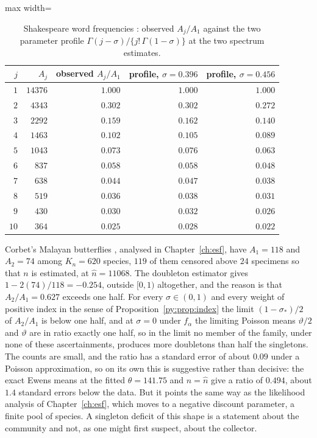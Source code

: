 \begin{table}[t]
\centering
\caption{Shakespeare word frequencies \citep{py:efron1976}: observed $A_j/A_1$ against the two
parameter profile $\Gamma(j-\sigma)/\{j!\,\Gamma(1-\sigma)\}$ at the two spectrum estimates.}
\label{py:tab:shakespeare}
\small
\begin{adjustbox}{max width=\textwidth}
\begin{tabular}{rrrrr}
\toprule
$j$ & $A_j$ & observed $A_j/A_1$ & profile, $\sigma = 0.396$ & profile, $\sigma = 0.456$\\
\midrule
$1$  & $14376$ & $1.000$ & $1.000$ & $1.000$\\
$2$  & $4343$  & $0.302$ & $0.302$ & $0.272$\\
$3$  & $2292$  & $0.159$ & $0.162$ & $0.140$\\
$4$  & $1463$  & $0.102$ & $0.105$ & $0.089$\\
$5$  & $1043$  & $0.073$ & $0.076$ & $0.063$\\
$6$  & $837$   & $0.058$ & $0.058$ & $0.048$\\
$7$  & $638$   & $0.044$ & $0.047$ & $0.038$\\
$8$  & $519$   & $0.036$ & $0.038$ & $0.031$\\
$9$  & $430$   & $0.030$ & $0.032$ & $0.026$\\
$10$ & $364$   & $0.025$ & $0.028$ & $0.022$\\
\bottomrule
\end{tabular}
\end{adjustbox}
\end{table}

\begin{example}
\label{py:ex:corbet}
Corbet's Malayan butterflies \citep{py:fisher1943}, analysed in Chapter~\ref{ch:esf}, have
$A_1 = 118$ and $A_2 = 74$ among $K_n = 620$ species, $119$ of them censored above $24$
specimens so that $n$ is estimated, at $\hat n = 11068$. The doubleton
estimator gives $1 - 2(74)/118 = -0.254$, outside $[0,1)$ altogether, and the reason is that
$A_2/A_1 = 0.627$ exceeds one half. For every $\sigma \in (0,1)$ and every weight of positive index in the sense of Proposition~\ref{py:prop:index}
the limit $(1-\sigma_*)/2$ of $A_2/A_1$ is below one half, and at $\sigma = 0$ under $f_\alpha$ the limiting Poisson means
$\vartheta/2$ and $\vartheta$ are in ratio exactly one half, so in the limit no member of the family, under none of these
ascertainments, produces more doubletons than half the singletons. The
counts are small, and the ratio has a standard error of about $0.09$ under a Poisson approximation,
so on its own this is suggestive rather than decisive: the exact Ewens means at the fitted
$\theta = 141.75$ and $n = \hat n$ give a ratio of $0.494$, about $1.4$ standard errors below the data. But it points
the same way as the likelihood analysis of Chapter~\ref{ch:esf}, which moves to a negative
discount parameter, a finite pool of species. A singleton deficit of this shape is a statement about
the community and not, as one might first suspect, about the collector.
\end{example}

